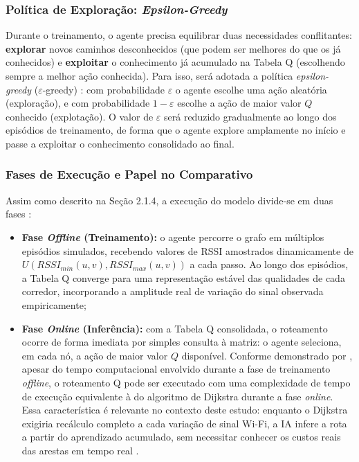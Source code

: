\documentclass[
    12pt,                %
    openright,           %
    oneside,             %
    a4paper,             %
    english,             %
    brazil               %
]{abntex2}
\begin{document}
\subsubsection*{Política de Exploração: \textit{Epsilon-Greedy}}

Durante o treinamento, o agente precisa equilibrar duas necessidades conflitantes:
\textbf{explorar} novos caminhos desconhecidos (que podem ser melhores do que os
já conhecidos) e \textbf{exploitar} o conhecimento já acumulado na Tabela Q
(escolhendo sempre a melhor ação conhecida). Para isso, será adotada a política
\textit{epsilon-greedy} ($\varepsilon$-greedy) \cite{Sutton2018}: com probabilidade
$\varepsilon$ o agente escolhe uma ação aleatória (exploração), e com probabilidade
$1 - \varepsilon$ escolhe a ação de maior valor $Q$ conhecido (explotação). O valor
de $\varepsilon$ será reduzido gradualmente ao longo dos episódios de treinamento,
de forma que o agente explore amplamente no início e passe a exploitar o conhecimento
consolidado ao final.

\subsubsection*{Fases de Execução e Papel no Comparativo}

Assim como descrito na Seção 2.1.4, a execução do modelo divide-se em duas fases
\cite{Pham2025}:

\begin{itemize}
    \item \textbf{Fase \textit{Offline} (Treinamento):} o agente percorre o grafo
    em múltiplos episódios simulados, recebendo valores de RSSI amostrados
    dinamicamente de $U(RSSI_{min}(u,v), RSSI_{max}(u,v))$ a cada passo. Ao longo
    dos episódios, a Tabela Q converge para uma representação estável das qualidades
    de cada corredor, incorporando a amplitude real de variação do sinal observada
    empiricamente; %

    \item \textbf{Fase \textit{Online} (Inferência):} com a Tabela Q consolidada,
    o roteamento ocorre de forma imediata por simples consulta à matriz: o agente
    seleciona, em cada nó, a ação de maior valor $Q$ disponível. Conforme demonstrado
    por , apesar do tempo computacional envolvido durante a fase
    de treinamento \textit{offline}, o roteamento Q pode ser executado com uma
    complexidade de tempo de execução equivalente à do algoritmo de Dijkstra durante
    a fase \textit{online}. Essa característica é relevante no contexto deste estudo:
    enquanto o Dijkstra exigiria recálculo completo a cada variação de sinal Wi-Fi,
    a IA infere a rota a partir do aprendizado acumulado, sem necessitar conhecer os
    custos reais das arestas em tempo real \cite{Pham2025}.
\end{itemize}
\end{document}
